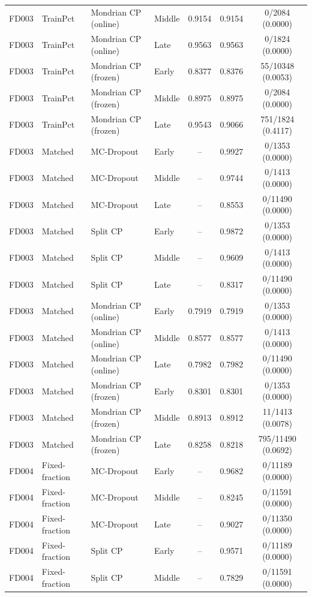 \begin{table}[t]
\begin{tabular}{llllccc}
FD003 & TrainPct & Mondrian CP (online) & Middle & 0.9154 & 0.9154 & 0/2084 (0.0000) \\
FD003 & TrainPct & Mondrian CP (online) & Late & 0.9563 & 0.9563 & 0/1824 (0.0000) \\
FD003 & TrainPct & Mondrian CP (frozen) & Early & 0.8377 & 0.8376 & 55/10348 (0.0053) \\
FD003 & TrainPct & Mondrian CP (frozen) & Middle & 0.8975 & 0.8975 & 0/2084 (0.0000) \\
FD003 & TrainPct & Mondrian CP (frozen) & Late & 0.9543 & 0.9066 & 751/1824 (0.4117) \\
FD003 & Matched & MC-Dropout & Early & -- & 0.9927 & 0/1353 (0.0000) \\
FD003 & Matched & MC-Dropout & Middle & -- & 0.9744 & 0/1413 (0.0000) \\
FD003 & Matched & MC-Dropout & Late & -- & 0.8553 & 0/11490 (0.0000) \\
FD003 & Matched & Split CP & Early & -- & 0.9872 & 0/1353 (0.0000) \\
FD003 & Matched & Split CP & Middle & -- & 0.9609 & 0/1413 (0.0000) \\
FD003 & Matched & Split CP & Late & -- & 0.8317 & 0/11490 (0.0000) \\
FD003 & Matched & Mondrian CP (online) & Early & 0.7919 & 0.7919 & 0/1353 (0.0000) \\
FD003 & Matched & Mondrian CP (online) & Middle & 0.8577 & 0.8577 & 0/1413 (0.0000) \\
FD003 & Matched & Mondrian CP (online) & Late & 0.7982 & 0.7982 & 0/11490 (0.0000) \\
FD003 & Matched & Mondrian CP (frozen) & Early & 0.8301 & 0.8301 & 0/1353 (0.0000) \\
FD003 & Matched & Mondrian CP (frozen) & Middle & 0.8913 & 0.8912 & 11/1413 (0.0078) \\
FD003 & Matched & Mondrian CP (frozen) & Late & 0.8258 & 0.8218 & 795/11490 (0.0692) \\
FD004 & Fixed-fraction & MC-Dropout & Early & -- & 0.9682 & 0/11189 (0.0000) \\
FD004 & Fixed-fraction & MC-Dropout & Middle & -- & 0.8245 & 0/11591 (0.0000) \\
FD004 & Fixed-fraction & MC-Dropout & Late & -- & 0.9027 & 0/11350 (0.0000) \\
FD004 & Fixed-fraction & Split CP & Early & -- & 0.9571 & 0/11189 (0.0000) \\
FD004 & Fixed-fraction & Split CP & Middle & -- & 0.7829 & 0/11591 (0.0000) \\

\end{tabular}
\end{table}
